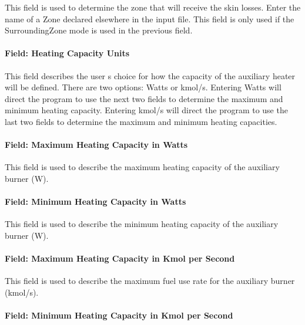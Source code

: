 This field is used to determine the zone that will receive the skin losses. Enter the name of a Zone declared elsewhere in the input file. This field is only used if the SurroundingZone mode is used in the previous field.

\paragraph{Field: Heating Capacity Units}\label{field-heating-capacity-units}

This field describes the user s choice for how the capacity of the auxiliary heater will be defined. There are two options: Watts or kmol/s. Entering Watts will direct the program to use the next two fields to determine the maximum and minimum heating capacity. Entering kmol/s will direct the program to use the last two fields to determine the maximum and minimum heating capacities.

\paragraph{Field: Maximum Heating Capacity in Watts}\label{field-maximum-heating-capacity-in-watts}

This field is used to describe the maximum heating capacity of the auxiliary burner (W).

\paragraph{Field: Minimum Heating Capacity in Watts}\label{field-minimum-heating-capacity-in-watts}

This field is used to describe the minimum heating capacity of the auxiliary burner (W).

\paragraph{Field: Maximum Heating Capacity in Kmol per Second}\label{field-maximum-heating-capacity-in-kmol-per-second}

This field is used to describe the maximum fuel use rate for the auxiliary burner (kmol/s).

\paragraph{Field: Minimum Heating Capacity in Kmol per Second}\label{field-minimum-heating-capacity-in-kmol-per-second}

